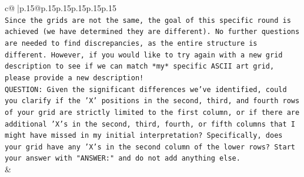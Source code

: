 \documentclass{article}
\begin{document}
{\begin{supertabular}{c@{$\;$}|p{.15\linewidth}@{}p{.15\linewidth}p{.15\linewidth}p{.15\linewidth}p{.15\linewidth}p{.15\linewidth}}
{{{\\ 
\texttt{Since the grids are not the same, the goal of this specific round is achieved (we have determined they are different). No further questions are needed to find discrepancies, as the entire structure is different. However, if you would like to try again with a new grid description to see if we can match *my* specific ASCII art grid, please provide a new description!} \\
\texttt{QUESTION: Given the significant differences we've identified, could you clarify if the 'X' positions in the second, third, and fourth rows of your grid are strictly limited to the first column, or if there are additional 'X's in the second, third, fourth, or fifth columns that I might have missed in my initial interpretation? Specifically, does your grid have any 'X's in the second column of the lower rows? Start your answer with "ANSWER:" and do not add anything else.} \\
            }
        }
    }
    & \\ \\


\end{supertabular}}
\end{document}
